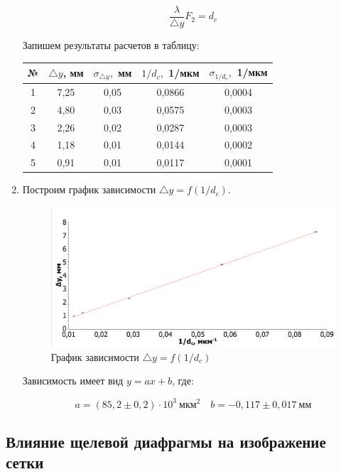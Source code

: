 \documentclass[a4paper, 12pt]{article}%
\begin{document}
\begin{enumerate}
\[\frac{\lambda}{\bigtriangleup y} F_2 = d_c\]

Запишем результаты расчетов в таблицу:

\begin{center}
\begin{tabular}{|c|c|c|c|c|}
\hline 
№ & $\bigtriangleup y$, мм & $\sigma_{\bigtriangleup y},$ мм & $1/d_c,$ 1/мкм & $\sigma_{1/d_c},$ 1/мкм \\ 
\hline 
1 & 7,25 & 0,05 & 0,0866 & 0,0004 \\ 
\hline 
2 & 4,80 & 0,03 & 0,0575 & 0,0003 \\ 
\hline 
3 & 2,26 & 0,02 & 0,0287 & 0,0003 \\ 
\hline 
4 & 1,18 & 0,01 & 0,0144 & 0,0002 \\ 
\hline 
5 & 0,91 & 0,01 & 0,0117 & 0,0001 \\ 
\hline 
\end{tabular} 
\end{center}

\item Построим график зависимости $\bigtriangleup y = f(1/d_c)$.

\begin{figure}[h!]
    \centering
	\includegraphics[width = 0.8\linewidth]{images/graph_4.png}
	\caption{График зависимости $\bigtriangleup y = f(1/d_c)$}
\end{figure}

Зависимость имеет вид $y = ax + b$, где:

\[a = (85,2 \pm 0,2) \cdot 10^3 \: \text{мкм}^2 \quad b = -0,117 \pm 0,017 \: \text{мм}\]

\end{enumerate}

\subsection*{Влияние щелевой диафрагмы на изображение сетки}
\end{document}
